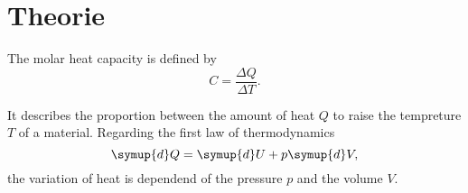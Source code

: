 \section{Theorie}
\label{sec:Theorie}

The molar heat capacity is defined by 
\begin{equation}
    C = \frac{\Delta Q}{\Delta T}.
\end{equation}

It describes the proportion between the amount of heat $Q$ to raise the tempreture $T$ of a material. 
Regarding the first law of thermodynamics
\begin{equation}
    \symup{d}Q = \symup{d}U+p\symup{d}V,
\end{equation}
the variation of heat is dependend of the pressure $p$ and the volume $V$.



